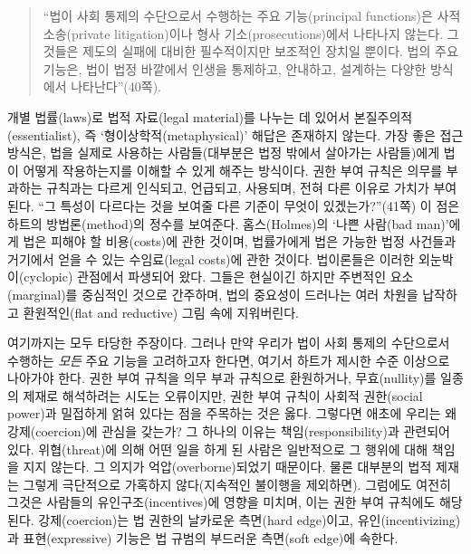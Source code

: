 \documentclass[12pt, oneside]{book}  %
\begin{document}
\begin{quote}
``법이 사회 통제의 수단으로서 수행하는 주요 기능(principal functions)은
사적 소송(private litigation)이나 형사 기소(prosecutions)에서 나타나지
않는다. 그것들은 제도의 실패에 대비한 필수적이지만 보조적인 장치일
뿐이다. 법의 주요 기능은, 법이 법정 바깥에서 인생을 통제하고, 안내하고,
설계하는 다양한 방식에서 나타난다''(40쪽).
\end{quote}

개별 법률(laws)로 법적 자료(legal material)를 나누는 데 있어서
본질주의적(essentialist), 즉 `형이상학적(metaphysical)' 해답은 존재하지
않는다. 가장 좋은 접근 방식은, 법을 실제로 사용하는 사람들(대부분은 법정
밖에서 살아가는 사람들)에게 법이 어떻게 작용하는지를 이해할 수 있게
해주는 방식이다. 권한 부여 규칙은 의무를 부과하는 규칙과는 다르게
인식되고, 언급되고, 사용되며, 전혀 다른 이유로 가치가 부여된다. ``그
특성이 다르다는 것을 보여줄 다른 기준이 무엇이 있겠는가?''(41쪽) 이 점은
하트의 방법론(method)의 정수를 보여준다. 홈스(Holmes)의 `나쁜 사람(bad
man)'에게 법은 피해야 할 비용(costs)에 관한 것이며, 법률가에게 법은
가능한 법정 사건들과 거기에서 얻을 수 있는 수임료(legal costs)에 관한
것이다. 법이론들은 이러한 외눈박이(cyclopic) 관점에서 파생되어 왔다.
그들은 현실이긴 하지만 주변적인 요소(marginal)를 중심적인 것으로
간주하며, 법의 중요성이 드러나는 여러 차원을 납작하고 환원적인(flat and
reductive) 그림 속에 지워버린다.

여기까지는 모두 타당한 주장이다. 그러나 만약 우리가 법이 사회 통제의
수단으로서 수행하는 \emph{모든} 주요 기능을 고려하고자 한다면, 여기서
하트가 제시한 수준 이상으로 나아가야 한다. 권한 부여 규칙을 의무 부과
규칙으로 환원하거나, 무효(nullity)를 일종의 제재로 해석하려는 시도는
오류이지만, 권한 부여 규칙이 사회적 권한(social power)과 밀접하게 얽혀
있다는 점을 주목하는 것은 옳다. 그렇다면 애초에 우리는 왜
강제(coercion)에 관심을 갖는가? 그 하나의 이유는 책임(responsibility)과
관련되어 있다. 위협(threat)에 의해 어떤 일을 하게 된 사람은 일반적으로
그 행위에 대해 책임을 지지 않는다. 그 의지가 억압(overborne)되었기
때문이다. 물론 대부분의 법적 제재는 그렇게 극단적으로 가혹하지
않다(지속적인 불이행을 제외하면). 그럼에도 여전히 그것은 사람들의
유인구조(incentives)에 영향을 미치며, 이는 권한 부여 규칙에도 해당된다.
강제(coercion)는 법 권한의 날카로운 측면(hard edge)이고,
유인(incentivizing)과 표현(expressive) 기능은 법 규범의 부드러운
측면(soft edge)에 속한다.
\end{document}
